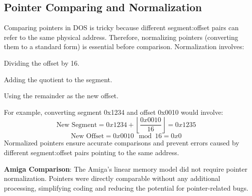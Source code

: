 \documentclass[a4paper]{article}
\begin{document}
\subsection*{Pointer Comparing and Normalization}
Comparing pointers in DOS is tricky because different segment:offset pairs can refer to the same physical address. Therefore, normalizing pointers (converting them to a standard form) is essential before comparison. Normalization involves:

\begin{enumerate}
  \begin{item}
    Dividing the offset by 16.
  \end{item}
  \begin{item}
    Adding the quotient to the segment.
  \end{item}
  \begin{item}
    Using the remainder as the new offset.
  \end{item}
\end{enumerate}
For example, converting segment 0x1234 and offset 0x0010 would involve:
\[
\text{New Segment} = 0x1234 + \left\lfloor \frac{0x0010}{16} \right\rfloor = 0x1235
\]
\[
\text{New Offset} = 0x0010 \mod 16 = 0x0
\]
Normalized pointers ensure accurate comparisons and prevent errors caused by different segment:offset pairs pointing to the same address.

\textbf{Amiga Comparison}: The Amiga’s linear memory model did not require pointer normalization. Pointers were directly comparable without any additional processing, simplifying coding and reducing the potential for pointer-related bugs.
\end{document}
